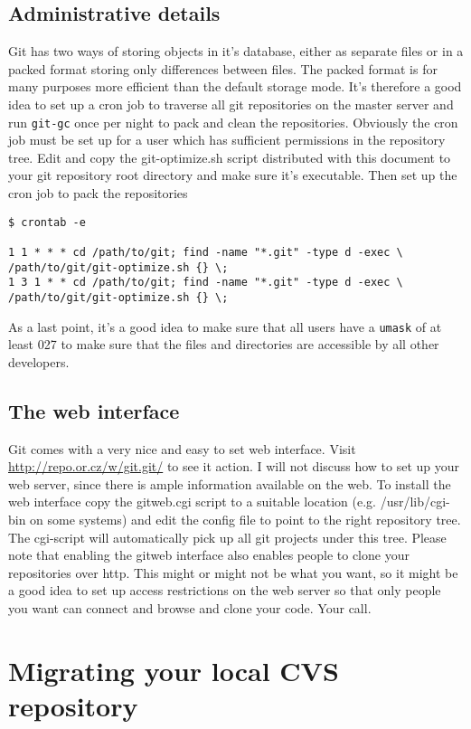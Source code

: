 \documentclass[a4paper,10pt]{article}
\begin{document}
\subsection{Administrative details} 
Git has two ways of storing objects in it's database, either as separate
files or in a packed format storing only differences between files. The packed
format is for many purposes more efficient than the default storage mode. It's
therefore a good idea to set up a cron job to traverse all git repositories on
the master server and run \texttt{git-gc} once per night to pack and clean the
repositories. Obviously the cron job must be set up for a user which has
sufficient permissions in the repository tree. Edit and copy the git-optimize.sh
script distributed with this document to your git repository root directory
and make sure it's executable. Then set up the cron job to pack the
repositories
\begin{verbatim}
$ crontab -e

1 1 * * * cd /path/to/git; find -name "*.git" -type d -exec \
/path/to/git/git-optimize.sh {} \;
1 3 1 * * cd /path/to/git; find -name "*.git" -type d -exec \
/path/to/git/git-optimize.sh {} \;
\end{verbatim}

As a last point, it's a good idea to make sure that all users have a
\texttt{umask} of at least 027 to make sure that the files and directories are
accessible by all other developers.

\subsection{The web interface}
Git comes with a very nice and easy to set web interface. Visit 
\url{http://repo.or.cz/w/git.git/} to see it action. I will not discuss how to
set up your web server, since there is ample information available on the web.
To install the web interface copy the gitweb.cgi script to a suitable
location (e.g. /usr/lib/cgi-bin on some systems) and edit the config file to
point to the right repository tree. The cgi-script will automatically pick up
all git projects under this tree. Please note that enabling the gitweb
interface also enables people to clone your repositories over http. This might
or might not be what you want, so it might be a good idea to set up access
restrictions on the web server so that only people you want can connect and
browse and clone your code. Your call.

\section{Migrating your local CVS repository}
\end{document}
